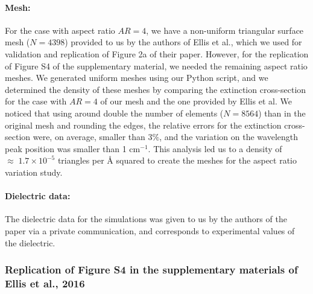 \paragraph{Mesh:}
For the case with aspect ratio $AR=4$, we have a non-uniform triangular surface mesh ($N=4398$) provided to us by the authors of 
Ellis et al., which we used for validation and replication of Figure 2a of their paper. However, for the replication
of Figure S4 of the supplementary material, we needed the remaining aspect ratio meshes. We generated uniform meshes using our
Python script, and we determined the density of these meshes by comparing the extinction cross-section for the case with $AR=4$ of 
our mesh and the one provided by Ellis et al. We noticed that using around double the number of elements ($N=8564$) than in the original mesh and 
rounding the edges, the relative errors for the extinction cross-section were, on average, smaller than 3$\%$, and the variation on the wavelength peak
position was smaller than 1 cm$^{-1}$. This analysis led us to a density of $\approx \; 1.7 \times10^{-5}$ triangles per $\text{\AA}$ squared to create the meshes for 
the aspect ratio variation study.


\paragraph{Dielectric data:}
The dielectric data for the simulations was given to us by the authors of the paper via a private communication, 
and corresponds to experimental values of the dielectric. 

\subsubsection{Replication of Figure S4 in the supplementary materials of Ellis et al., 2016}

